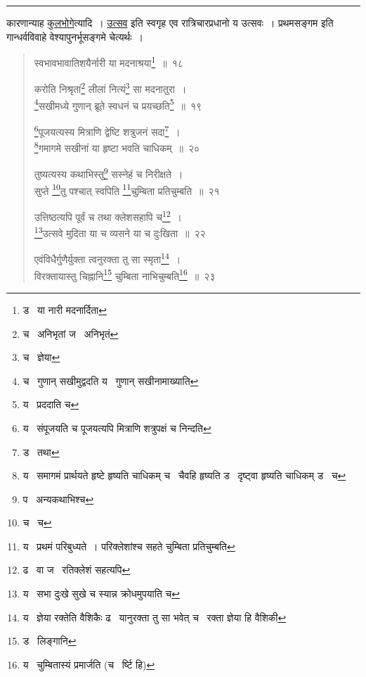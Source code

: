 \documentclass[11pt, openany]{book}
\begin{document}
\hrule

\vspace{2mm}
\noindent
कारणान्याह \underline{कुलभोगे}त्यादि~। \underline{उत्सव} इति स्वगृह एव रात्रिचारप्रधानो य उत्सवः~। प्रथमसङ्गम इति गान्धर्वविवाहे वेश्यापुनर्भूसङ्गमे चेत्यर्थः~।

\newpage

\begin{quote}
{\na स्वभावभावातिशयैर्नारी या मदनाश्रया\renewcommand{\thefootnote}{1}\footnote{ड \textendash\  या नारी मदनार्दिता}~॥~१८

करोति निश्रृतां\renewcommand{\thefootnote}{2}\footnote{च \textendash\  अनिभृतां ज \textendash\  अनिभृतं} लीलां नित्यं\renewcommand{\thefootnote}{3}\footnote{च \textendash\  ज्ञेया} सा मदनातुरा~।\\
\renewcommand{\thefootnote}{4}\footnote{च \textendash\  गुणान् सखीमुद्वदति य \textendash\  गुणान् सखीनामाख्याति}सखीमध्ये गुणान् ब्रूते स्वधनं च प्रयच्छति\renewcommand{\thefootnote}{5}\footnote{य \textendash\  प्रददाति च}~॥~१९

\renewcommand{\thefootnote}{6}\footnote{य \textendash\  संपूजयति च पूजयत्यपि मित्राणि शत्रुपक्षं च निन्दति}पूजयत्यस्य मित्राणि द्वेष्टि शत्रुजनं सदा\renewcommand{\thefootnote}{7}\footnote{ड \textendash\  तथा}~।\\
\renewcommand{\thefootnote}{8}\footnote{य \textendash\  समागमं प्रार्थयते हृष्टे हृष्यति चाधिकम् च \textendash\  चैवहि हृष्यति ड \textendash\ दृष्ट्वा हृष्यति चाधिकम् ड \textendash\  च}गमागमे सखीनां या हृष्टा भवति चाधिकम्~॥~२०

तुष्यत्यस्य कथाभिस्तु\renewcommand{\thefootnote}{9}\footnote{प \textendash\  अन्यकथाभिश्च} सस्नेहं च निरीक्षते~।\\
सुप्ते \renewcommand{\thefootnote}{10}\footnote{च \textendash\  च}तु पश्चात् स्वपिति \renewcommand{\thefootnote}{11}\footnote{य \textendash\  प्रथमं परिबुध्यते~। परिक्लेशांश्च सहते चुम्बिता प्रतिचुम्बति}चुम्बिता प्रतिचुम्बति~॥~२१

उत्तिष्ठत्यपि पूर्वं च तथा क्लेशसहापि च\renewcommand{\thefootnote}{12}\footnote{ढ \textendash\  वा ज \textendash\  रतिक्लेशं सहत्यपि}~।\\
\renewcommand{\thefootnote}{13}\footnote{य \textendash\  सभा दुःखे सुखे च स्यान्न क्रोधमुपयाति च}उत्सवे मुदिता या च व्यसने या च दुःखिता~॥~२२

एवंविधैर्गुणैर्युक्ता त्वनुरक्ता तु सा स्मृता\renewcommand{\thefootnote}{14}\footnote{य \textendash\  ज्ञेया रक्तेति वैशिकैः ढ \textendash\  यानुरक्ता तु सा भवेत् च \textendash\  रक्ता ज्ञेया हि वैशिकी}~।\\
विरक्तायास्तु चिह्नानि\renewcommand{\thefootnote}{15}\footnote{ड \textendash\  लिङ्गानि} चुम्बिता नाभिचुम्बति\renewcommand{\thefootnote}{16}\footnote{य \textendash\  चुम्बितास्यं प्रमार्जति (च \textendash\  र्ष्टि हि)}~॥~२३}
\end{quote}
\end{document}
